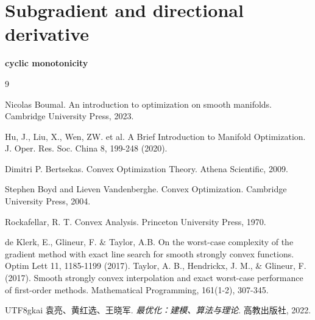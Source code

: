 \documentclass[a4paper]{mynotes}
\begin{document}
\section{Subgradient and directional derivative}
\textbf{cyclic monotonicity}
\begin{thebibliography}{9}

 Nicolas Boumal. An introduction to optimization on smooth manifolds. Cambridge University Press, 2023.

 Hu, J., Liu, X., Wen, ZW. et al. A Brief Introduction to Manifold Optimization. J. Oper. Res. Soc. China 8, 199-248 (2020).

 Dimitri P. Bertsekas. Convex Optimization Theory. Athena Scientific, 2009.

 Stephen Boyd and Lieven Vandenberghe. Convex Optimization. Cambridge University Press, 2004.

 Rockafellar, R. T. Convex Analysis. Princeton University Press, 1970.

 de Klerk, E., Glineur, F. \& Taylor, A.B. On the worst-case complexity of the gradient method with exact line search for smooth strongly convex functions. Optim Lett 11, 1185-1199 (2017).
 Taylor, A. B., Hendrickx, J. M., \& Glineur, F. (2017). Smooth strongly convex interpolation and exact worst-case performance of first-order methods. Mathematical Programming, 161(1-2), 307-345.
\begin{CJK*}{UTF8}{gkai}
 袁亮、黄红选、王晓军. \textit{最优化：建模、算法与理论}. 高教出版社, 2022.
\end{CJK*}
\end{thebibliography}
\printindex
\end{document}
